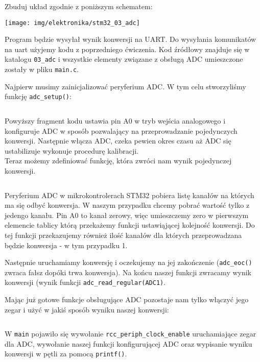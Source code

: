 \documentclass{pdfBooklets}
\begin{document}
Zbuduj układ zgodnie z poniższym schematem:

\begin{center}\texttt{[image: img/elektronika/stm32\_03\_adc]}\end{center}

Program będzie wysyłał wynik konwersji na UART. Do wysyłania komunikatów na uart użyjemy kodu z poprzedniego ćwiczenia.
Kod źródłowy znajduje się w katalogu \Verb$03_adc$ i wszystkie elementy związane z obsługą ADC umieszczone zostały w pliku \Verb$main.c$.

Najpierw musimy zainicjalizować peryferium ADC. W tym celu stworzyliśmy funkcję \Verb$adc_setup()$:

\inputminted[frame=single,firstline=13,lastline=35]{c}{stm32-examples/03_adc/main.c} %

Powyższy fragment kodu ustawia pin A0 w tryb wejścia analogowego i konfiguruje ADC w sposób pozwalający na przeprowadzanie pojedynczych konwersji. Następnie włącza ADC, czeka pewien okres czasu aż ADC się ustabilizuje wykonuje procedurę kalibracji.\\

Teraz możemy zdefiniować funkcję, która zwróci nam wynik pojedynczej konwersji.

\inputminted[frame=single,firstline=36,lastline=48]{c}{stm32-examples/03_adc/main.c} %

Peryferium ADC w mikrokontrolerach STM32 pobiera listę kanałów na których ma się odbyć konwersja. W naszym przypadku chcemy pobrać
wartość tylko z jedengo kanału. Pin A0 to kanał zerowy, więc umieszczemy zero w pierwszym elemencie tablicy którą przekażemy
funkcji ustawiąjącej kolejność konwersji. Do tej funkcji przekazujemy również ilość kanałów dla których przeprowadzana będzie
konwersja - w tym przypadku 1.

Następnie uruchamiamy konwersję i oczekujemy na jej zakończenie (\Verb$adc_eoc()$ zwraca fałsz dopóki trwa konwersja).
Na końcu naszej funkcji zwracamy wynik konwersji (wynik funkcji \Verb$adc_read_regular(ADC1)$.

Mając już gotowe funkcje obsługujące ADC pozostaje nam tylko włączyć jego zegar i użyć w jakiś sposób wyniku naszej konwersji:

\inputminted[frame=single,firstline=49]{c}{stm32-examples/03_adc/main.c} %

W \Verb$main$ pojawiło się wywołanie \Verb$rcc_periph_clock_enable$ uruchamiające zegar dla ADC, wywołanie naszej funkcji
konfigurującej ADC oraz wypisanie wyniku konwersji w pętli za pomocą \Verb$printf()$.
\end{document}
